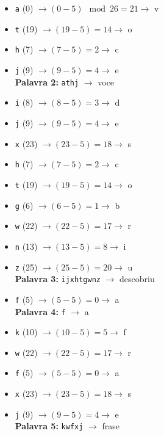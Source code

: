 \begin{itemize}
    \item \texttt{a} (0) \(\rightarrow (0 - 5) \mod 26 = 21 \rightarrow\) v
    \item \texttt{t} (19) \(\rightarrow (19 - 5) = 14 \rightarrow\) o
    \item \texttt{h} (7) \(\rightarrow (7 - 5) = 2 \rightarrow\) c
    \item \texttt{j} (9) \(\rightarrow (9 - 5) = 4 \rightarrow\) e \\
    \textbf{Palavra 2:} \texttt{athj} \(\rightarrow\) voce
\end{itemize}

\begin{itemize}
    \item \texttt{i} (8) \(\rightarrow (8 - 5) = 3 \rightarrow\) d
    \item \texttt{j} (9) \(\rightarrow (9 - 5) = 4 \rightarrow\) e
    \item \texttt{x} (23) \(\rightarrow (23 - 5) = 18 \rightarrow\) s
    \item \texttt{h} (7) \(\rightarrow (7 - 5) = 2 \rightarrow\) c
    \item \texttt{t} (19) \(\rightarrow (19 - 5) = 14 \rightarrow\) o
    \item \texttt{g} (6) \(\rightarrow (6 - 5) = 1 \rightarrow\) b
    \item \texttt{w} (22) \(\rightarrow (22 - 5) = 17 \rightarrow\) r
    \item \texttt{n} (13) \(\rightarrow (13 - 5) = 8 \rightarrow\) i
    \item \texttt{z} (25) \(\rightarrow (25 - 5) = 20 \rightarrow\) u \\
    \textbf{Palavra 3:} \texttt{ijxhtgwnz} \(\rightarrow\) descobriu
\end{itemize}

\begin{itemize}
    \item \texttt{f} (5) \(\rightarrow (5 - 5) = 0 \rightarrow\) a \\
    \textbf{Palavra 4:} \texttt{f} \(\rightarrow\) a
\end{itemize}

\begin{itemize}
    \item \texttt{k} (10) \(\rightarrow (10 - 5) = 5 \rightarrow\) f
    \item \texttt{w} (22) \(\rightarrow (22 - 5) = 17 \rightarrow\) r
    \item \texttt{f} (5) \(\rightarrow (5 - 5) = 0 \rightarrow\) a
    \item \texttt{x} (23) \(\rightarrow (23 - 5) = 18 \rightarrow\) s
    \item \texttt{j} (9) \(\rightarrow (9 - 5) = 4 \rightarrow\) e \\
    \textbf{Palavra 5:} \texttt{kwfxj} \(\rightarrow\) frase
\end{itemize}

